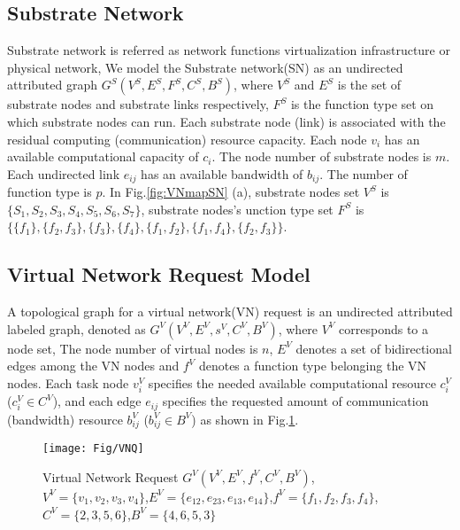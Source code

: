\subsection{Substrate Network}
Substrate network is referred as network functions virtualization infrastructure or physical network,  We model the Substrate network(SN) as an undirected attributed graph $G^S (V^S,E^S,F^S,C^S,B^S)$, where $V^S$ and $E^S$ is the set of substrate nodes and substrate links respectively, $F^S$ is the function type set on which substrate nodes can run. Each substrate node (link) is associated with the residual computing (communication) resource capacity. Each node $v_i$ has an available computational capacity of $c_i$. The node number of substrate nodes is $m$. Each undirected link $e_{ij}$ has an available bandwidth of $b_{ij}$. The number of function type is $p$. In Fig.\ref{fig:VNmapSN} (a),  substrate nodes set $V^S$ is $\{S_1,S_2,S_3,S_4,S_5,S_6,S_7\}$, substrate nodes's unction type set $F^S$ is $\{\{f_1\},\{f_2,f_3\},\{f_3\},\{f_4\},\{f_1,f_2\},\{f_1,f_4\},\{f_2,f_3\}\}$.

\subsection{Virtual Network Request Model}
A topological graph for a virtual network(VN) request is an undirected attributed labeled graph, denoted as $G^V (V^V,E^V,s^V,C^V,B^V)$, where $V^V$ corresponds to a node set, The node number of virtual nodes is $n$, $E^V$ denotes a set of bidirectional edges among the VN nodes and $f^V$ denotes a function type belonging the VN nodes. Each task node $v_i^V$ specifies the needed available computational resource $c_i^V$ ($c_i^V \in C^V$), and each edge $e_{ij}$ specifies the requested amount of communication (bandwidth) resource $b_{ij}^V$ ($b_{ij}^V \in B^V$) as shown in Fig.\ref{fig:VNQ}.
\begin{figure}
\centering
\texttt{[image: Fig/VNQ]}\\
\caption{Virtual Network Request $G^V (V^V,E^V,f^V,C^V,B^V)$, $V^V=\{v_1,v_2,v_3,v_4\}$,$E^V=\{e_{12},e_{23},e_{13},e_{14}\}$,$f^V=\{f_1,f_2,f_3,f_4\}$,$C^V=\{2,3,5,6\}$,$B^V=\{4,6,5,3\}$}\label{fig:VNQ}
\end{figure}

